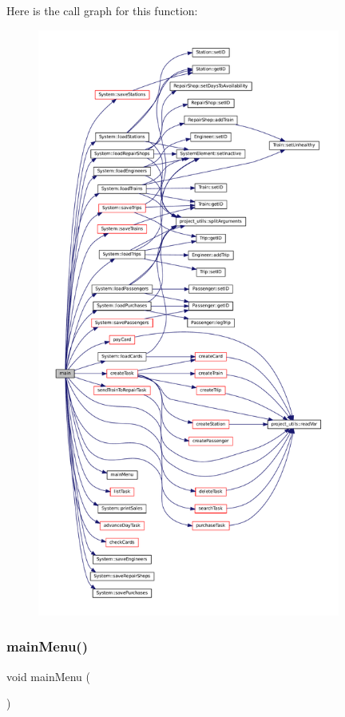 Here is the call graph for this function\+:
\nopagebreak
\begin{figure}[H]
\begin{center}
\leavevmode
\includegraphics[height=550pt]{Train-System_8cpp_ae66f6b31b5ad750f1fe042a706a4e3d4_cgraph}
\end{center}
\end{figure}
\mbox{\label{Train-System_8cpp_ab3002fe8e0074c9e2ecb5b835e5e819f}} 
\subsubsection{\texorpdfstring{main\+Menu()}{mainMenu()}}
{\footnotesize\ttfamily void main\+Menu (\begin{DoxyParamCaption}{ }\end{DoxyParamCaption})}



